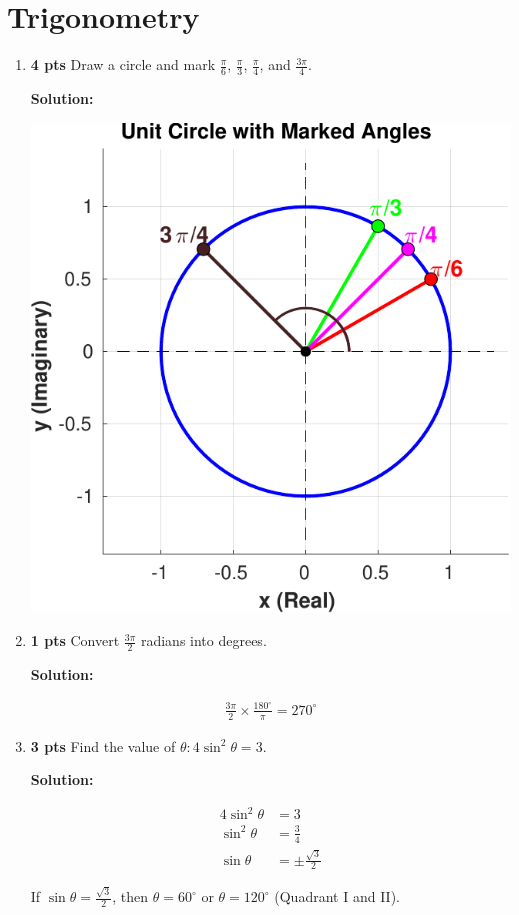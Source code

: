 \documentclass[nohyper,nobib,xcolor=dvipsnames,svgnames,x11names]{tufte-book}
\newenvironment{multiequation}{%
  \setlength{\abovedisplayskip}{3pt}      %
  \setlength{\belowdisplayskip}{6pt}      %
  \setlength{\abovedisplayshortskip}{3pt} %
  \setlength{\belowdisplayshortskip}{6pt} %
  \begin{equation}%
    \begin{aligned}%
}{%
    \end{aligned}%
  \end{equation}%
}
\begin{document}
\section{Trigonometry}
\begin{enumerate}
    \item \textbf{4 pts} Draw a circle and mark $\frac{\pi}{6}$, $\frac{\pi}{3}$, $\frac{\pi}{4}$, and $\frac{3\pi}{4}$.
    
    \textbf{Solution:}
    
    \includegraphics[width=0.6\linewidth]{../Code/figures/Ch01_radian_marking.pdf}

    \item \textbf{1 pts} Convert $\frac{3\pi}{2}$ radians into degrees.
    
     \textbf{Solution:}
     
    \begin{multiequation}
        \frac{3\pi}{2} \times \frac{180^\circ}{\pi} = 270^\circ
    \end{multiequation}

    \item \textbf{3 pts} Find the value of $\theta: 4\sin^2\theta=3$.
    
     \textbf{Solution:}
     
    \begin{multiequation}
        4\sin^2\theta &= 3 \\
        \sin^2\theta &= \frac{3}{4} \\
        \sin\theta &= \pm\frac{\sqrt{3}}{2}
    \end{multiequation}
    
    If $\sin\theta = \frac{\sqrt{3}}{2}$, then $\theta = 60^\circ$ or $\theta = 120^\circ$ (Quadrant I and II).
    

\end{enumerate}
\end{document}
